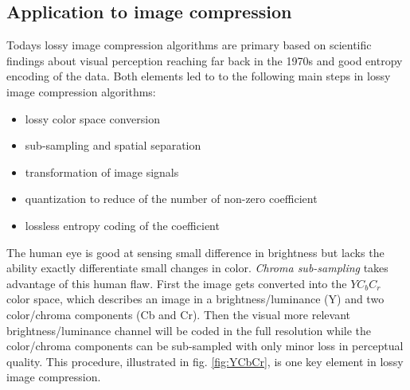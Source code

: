 \subsection{Application to image compression}
Todays lossy image compression algorithms are primary based on scientific
findings about visual perception reaching far back in the 1970s\cite{?} and
good entropy encoding of the data. Both elements led to to the
following main steps in lossy image compression algorithms:
\begin{itemize}
 \item lossy color space conversion
 \item sub-sampling and spatial separation
 \item transformation of image signals
 \item quantization to reduce of the number of non-zero coefficient 
 \item lossless entropy coding of the coefficient 
\end{itemize}
The human eye is good at sensing small difference in brightness but lacks the
ability exactly differentiate small changes in color. \emph{Chroma sub-sampling}
takes advantage of this human flaw. First the image gets converted into the
$YC_bC_r$ color space, which describes an image in a brightness/luminance (Y)
and two color/chroma components (Cb and Cr). Then the visual more relevant
brightness/luminance channel will be coded in the full resolution while the
color/chroma components can be sub-sampled with only minor loss in perceptual
quality. This procedure, illustrated in fig. \ref{fig:YCbCr}, is one key element
in lossy image compression. 
